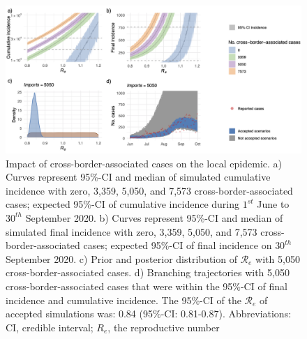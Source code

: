\documentclass[10pt, a4paper, twoside]{article}
\begin{document}
\begin{multicols}{2}
\begin{figure}
\centering
\includegraphics[scale=0.3]{Figure2_2021-04-30.png}
\caption{Impact of cross-border-associated cases on the local epidemic.
a) Curves represent 95\%-CI and median of simulated cumulative incidence with zero, 3,359, 5,050, and 7,573 cross-border-associated cases; expected 95\%-CI of cumulative incidence during $1^{st}$ June to $30^{th}$ September 2020.
b) Curves represent 95\%-CI and median of simulated final incidence with zero, 3,359, 5,050, and 7,573 cross-border-associated cases; expected 95\%-CI of final incidence on $30^{th}$ September 2020.
c) Prior and posterior distribution of $\mathcal{R}_e$ with 5,050 cross-border-associated cases.
d) Branching trajectories with 5,050 cross-border-associated cases that were within the 95\%-CI of final incidence and cumulative incidence.
The 95\%-CI of the $\mathcal{R}_e$ of accepted simulations was: 0.84 (95\%-CI: 0.81-0.87).
Abbreviations: CI, credible interval; $R_e$, the reproductive number}

\label{f2}
\end{figure}


\end{multicols}
\end{document}
